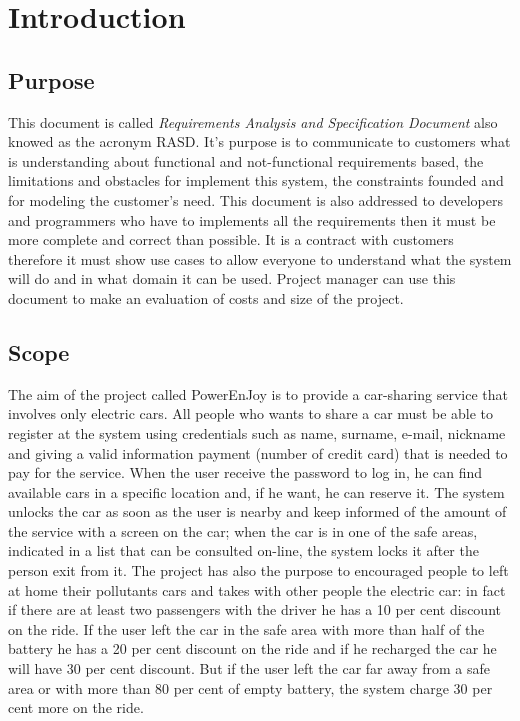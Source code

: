 \section{Introduction} \label{sec:intro}

\subsection{Purpose} \label{subsec:purpose}
This document is called \emph{Requirements Analysis and Specification Document} also knowed as the acronym RASD. It's purpose is to communicate to customers what is understanding about functional and not-functional requirements based, the limitations and obstacles for implement this system, the constraints founded and for modeling the customer's need. This document is also addressed to developers and programmers who have to implements all the requirements then it must be more complete and correct than possible. It is a contract with customers therefore it must show use cases to allow everyone to understand what the system will do and in what domain it can be used. Project manager can use this document to make an evaluation of costs and size of the project.


\subsection{Scope} \label{subsec:scope}
The aim of the project called PowerEnJoy is to provide a car-sharing service that involves only electric cars. All people who wants to share a car must be able to register at the system using credentials such as name, surname, e-mail, nickname and giving a valid information payment (number of credit card) that is needed to pay for the service. When the user receive the password to log in, he can find available cars in a specific location and, if he want, he can reserve it. The system unlocks the car as soon as the user is nearby and keep informed of the amount of the service with a screen on the car; when the car is in one of the safe areas, indicated in a list that can be consulted on-line, the system locks it after the person exit from it. The project has also the purpose to encouraged people to left at home their pollutants cars and takes with other people the electric car: in fact if there are at least two passengers with the driver he has a 10 per cent discount on the ride. If the user left the car in the safe area with more than half of the battery he has a 20 per cent discount on the ride and if he recharged the car he will have 30 per cent discount. But if the user left the car far away from a safe area or with more than 80 per cent of empty battery, the system charge 30 per cent more on the ride.

